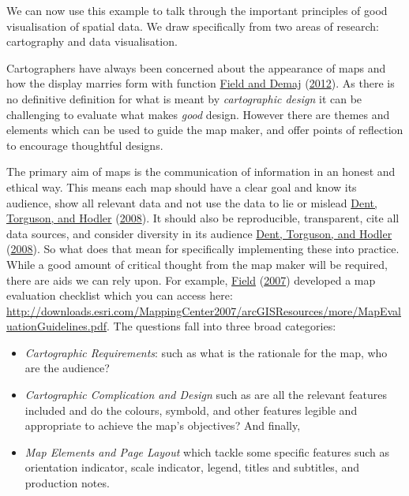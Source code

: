 \documentclass[
]{book}
\providecommand{\tightlist}{%
  \setlength{\itemsep}{0pt}\setlength{\parskip}{0pt}}
\begin{document}
We can now use this example to talk through the important principles of good visualisation of spatial data. We draw specifically from two areas of research: cartography and data visualisation.

Cartographers have always been concerned about the appearance of maps and how the display marries form with function \protect\hyperlink{ref-Field_2012}{Field and Demaj} (\protect\hyperlink{ref-Field_2012}{2012}). As there is no definitive definition for what is meant by \emph{cartographic design} it can be challenging to evaluate what makes \emph{good} design. However there are themes and elements which can be used to guide the map maker, and offer points of reflection to encourage thoughtful designs.

The primary aim of maps is the communication of information in an honest and ethical way. This means each map should have a clear goal and know its audience, show all relevant data and not use the data to lie or mislead \protect\hyperlink{ref-Dent_2008}{Dent, Torguson, and Hodler} (\protect\hyperlink{ref-Dent_2008}{2008}). It should also be reproducible, transparent, cite all data sources, and consider diversity in its audience \protect\hyperlink{ref-Dent_2008}{Dent, Torguson, and Hodler} (\protect\hyperlink{ref-Dent_2008}{2008}). So what does that mean for specifically implementing these into practice. While a good amount of critical thought from the map maker will be required, there are aids we can rely upon. For example, \protect\hyperlink{ref-Field_2007}{Field} (\protect\hyperlink{ref-Field_2007}{2007}) developed a map evaluation checklist which you can access here: \url{http://downloads.esri.com/MappingCenter2007/arcGISResources/more/MapEvaluationGuidelines.pdf}. The questions fall into three broad categories:

\begin{itemize}
\tightlist
\item
  \emph{Cartographic Requirements}: such as what is the rationale for the map, who are the audience?
\item
  \emph{Cartographic Complication and Design} such as are all the relevant features included and do the colours, symbold, and other features legible and appropriate to achieve the map's objectives? And finally,
\item
  \emph{Map Elements and Page Layout} which tackle some specific features such as orientation indicator, scale indicator, legend, titles and subtitles, and production notes.
\end{itemize}
\end{document}

